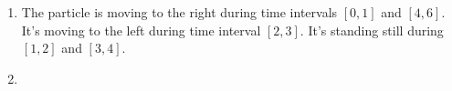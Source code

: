 \documentclass{../../../classes/anal}
\begin{document}

    \begin{enumerate}[label={(\alph*)}]
        \item The particle is moving to the right during time intervals \([0, 1]\) and \([4, 6]\). It's moving to the left during time interval \([2, 3]\). It's standing still during \([1, 2]\) and \([3, 4]\).
        \item {}
    \end{enumerate}
\end{document}
